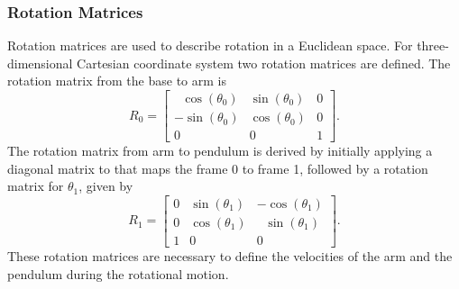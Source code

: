 \subsubsection{Rotation Matrices}
Rotation matrices are used to describe rotation in a Euclidean space. For three-dimensional Cartesian coordinate system two rotation matrices are defined.
The rotation matrix from the base to arm is
\begin{equation}
	R_0 = 	\begin{bmatrix}
					\ \ \,\cos(\theta_0) & \sin(\theta_0) & 0\\
					-\sin(\theta_0) & \cos(\theta_0) & 0\\
					0 & 0 & 1
				\end{bmatrix}.
\end{equation}
The rotation matrix from arm to pendulum is derived by
initially applying a diagonal matrix to that maps the frame
0 to frame 1, followed by a rotation matrix for $\theta_1$, given by
\begin{equation}
R_1 = 	\begin{bmatrix}
			0 & \sin(\theta_1) & -\cos(\theta_1)\\
			0 & \cos(\theta_1) & \ \ \,\sin(\theta_1)\\
			1 & 0 & 0                      
		\end{bmatrix}.
\end{equation}
These rotation matrices are necessary to define the velocities of the arm and the pendulum during the rotational motion. 
